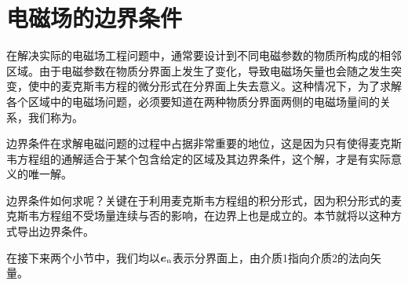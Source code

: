 \section{电磁场的边界条件}
在解决实际的电磁场工程问题中，通常要设计到不同电磁参数的物质所构成的相邻区域。由于电磁参数在物质分界面上发生了变化，导致电磁场矢量也会随之发生突变，使中的麦克斯韦方程的微分形式在分界面上失去意义。这种情况下，为了求解各个区域中的电磁场问题，必须要知道在两种物质分界面两侧的电磁场量间的关系，我们称为。

边界条件在求解电磁问题的过程中占据非常重要的地位，这是因为只有使得麦克斯韦方程组的通解适合于某个包含给定的区域及其边界条件，这个解，才是有实际意义的唯一解。

边界条件如何求呢？关键在于利用麦克斯韦方程组的积分形式，因为积分形式的麦克斯韦方程组不受场量连续与否的影响，在边界上也是成立的。本节就将以这种方式导出边界条件。

在接下来两个小节中，我们均以$\vb*{e}_\text{n}$表示分界面上，由介质1指向介质2的法向矢量。

